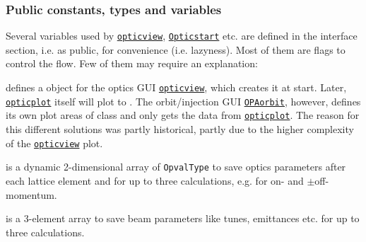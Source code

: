 \documentclass[12pt]{article}
\newcommand\code[1]{{\tt #1}}
\newcommand\guifco[1]{{\color{violet}\code{#1}}}
\newcommand{\unico}[1]{{\color{burntorange}\code{#1}}}
\newcommand{\opagui}[1]{\colorbox{blue!20}{\code{#1}}}
\newcommand{\ogui}[1]{\hyperref[#1]{\opagui{#1}}}
\newcommand{\opauni}[1]{\colorbox{orange!30}{\code{#1}}}
\newcommand{\ouni}[1]{\hyperref[#1]{\opauni{#1}}}
\newcommand{\pvar}[1]{\subsubsection*{Public constants, types and variables} #1}
\begin{document}
\pvar{
Several variables used by \ogui{opticview}, \ogui{Opticstart} etc. are defined in the interface section, i.e. as public, for convenience (i.e. lazyness). Most of them are flags to control the flow. Few of them may require an explanation:

\unico{vp} defines a \guifco{Vgraph} object for the optics GUI \ogui{opticview}, which creates it at start. Later, \ogui{opticplot} itself will plot to \unico{vp}. The orbit/injection GUI \ogui{OPAorbit}, however, defines its own plot areas of class \guifco{asfigure} and only gets the data from \ouni{opticplot}. The reason for this different solutions was partly historical, partly due to the higher complexity of the \ogui{opticview} plot.

\unico{Opval} is a dynamic 2-dimensional array of \code{OpvalType} to save optics parameters after each lattice element and for up to three calculations, e.g. for on- and $\pm$off-momentum.

\unico{Obeam} is a 3-element array to save beam parameters like tunes, emittances etc. for up to three calculations.
}
 
\end{document}

